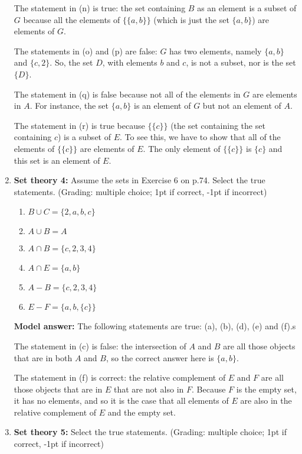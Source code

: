 \documentclass[a4,11pt]{article}
\begin{document}
\begin{enumerate}[leftmargin = 12pt]
The statement in (n) is true: the set containing $B$ as an element is a subset of $G$ because all the elements of $\{\{a,b\}\}$ (which is just the set $\{a,b\}$) are elements of $G$.

The statements in (o) and (p) are false: $G$ has two elements, namely $\{a,b\}$ and $\{c,2\}$. So, the set $D$, with elements $b$ and $c$, is not a subset, nor is the set $\{D\}$.

The statement in (q) is false because not all of the elements in $G$ are elements in $A$. For instance, the set $\{a,b\}$ is an element of $G$ but not an element of $A$.

The statement in (r) is true because $\{\{c\}\}$ (the set containing the set containing $c$) is a subset of $E$. To see this, we have to show that all of the elements of $\{\{c\}\}$ are elements of $E$. The only element of $\{\{c\}\}$ is $\{c\}$ and this set is an element of $E$.
 
 \item {\bf Set theory 4:} Assume the sets in Exercise 6 on p.74. Select the true statements.  (Grading: multiple choice; 1pt if correct, -1pt if incorrect)

      \begin{enumerate}[noitemsep]
        \item $B \cup C = \{2, a, b, c\} $
        \item $A \cup B = A $
	\item $A \cap B = \{c, 2, 3, 4\}$
	\item $A \cap E = \{a, b\} $
	\item $A - B = \{c, 2, 3, 4\} $
	\item $E - F = \{a , b, \{c\}\}$
         \end{enumerate}

 {\bf Model answer:} The following statements are true: (a), (b), (d), (e) and (f).s
 
 The statement in (c) is false: the intersection of $A$ and $B$ are all those objects that are in both $A$ and $B$, so the correct answer here is $\{a, b\}$.
 
 The statement in (f) is correct: the relative complement of $E$ and $F$ are all those objects that are in $E$ that are not also in $F$. Because $F$ is the empty set, it has no elements, and so it is the case that all elements of $E$ are also in the relative complement of $E$ and the empty set.
 
 \item {\bf Set theory 5:} Select the true statements.  (Grading: multiple choice; 1pt if correct, -1pt if incorrect)


\end{enumerate}
\end{document}
